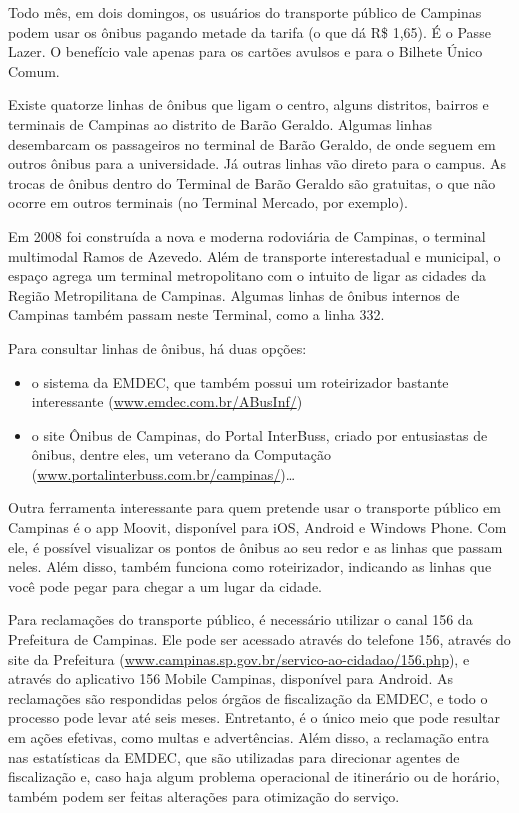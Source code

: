 Todo mês, em dois domingos, os usuários do transporte público de Campinas podem usar
os ônibus pagando metade da tarifa (o que dá R\$ 1,65). É o Passe Lazer. O benefício
vale apenas para os cartões avulsos e para o Bilhete Único Comum.

Existe quatorze linhas de ônibus que ligam o centro, alguns distritos, bairros e
terminais de Campinas ao distrito de Barão Geraldo. Algumas linhas desembarcam
os passageiros no terminal de Barão Geraldo, de onde seguem em outros ônibus
para a universidade. Já outras linhas vão direto para o campus. As trocas de
ônibus dentro do Terminal de Barão Geraldo são gratuitas, o que não ocorre em
outros terminais (no Terminal Mercado, por exemplo).

Em 2008 foi construída a nova e moderna rodoviária de Campinas, o terminal
multimodal Ramos de Azevedo. Além de transporte interestadual e municipal, o
espaço agrega um terminal metropolitano com o intuito de ligar as cidades da
Região Metropilitana de Campinas. Algumas linhas de ônibus internos de Campinas
também passam neste Terminal, como a linha 332.

Para consultar linhas de ônibus, há duas opções:
\begin{itemize}
  \item o sistema da EMDEC, que também possui um roteirizador bastante
  interessante (\url{www.emdec.com.br/ABusInf/})
  \item o site Ônibus de Campinas, do Portal InterBuss, criado por entusiastas
  de ônibus, dentre eles, um veterano da Computação 
  (\url{www.portalinterbuss.com.br/campinas/})\ldots
\end{itemize}

Outra ferramenta interessante para quem pretende usar o transporte público em
Campinas é o app Moovit, disponível para iOS, Android e Windows Phone. Com
ele, é possível visualizar os pontos de ônibus ao seu redor e as linhas que
passam neles. Além disso, também funciona como roteirizador, indicando
as linhas que você pode pegar para chegar a um lugar da cidade.

Para reclamações do transporte público, é necessário utilizar o canal 156
da Prefeitura de Campinas. Ele pode ser acessado através do telefone 156,
através do site da Prefeitura 
(\url{www.campinas.sp.gov.br/servico-ao-cidadao/156.php}), e através do 
aplicativo 156 Mobile Campinas, disponível para Android. As reclamações 
são respondidas pelos órgãos de fiscalização da EMDEC, e todo o processo pode 
levar até seis meses. Entretanto, é o único meio que pode resultar em 
ações efetivas, como multas e advertências. Além disso, a reclamação 
entra nas estatísticas da EMDEC, que são utilizadas para direcionar agentes 
de fiscalização e, caso haja algum problema operacional de itinerário ou 
de horário, também podem ser feitas alterações para otimização do serviço.


